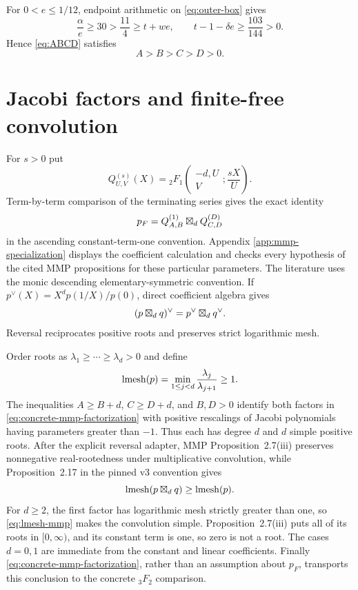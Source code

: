 \documentclass[12pt]{article}
\begin{document}
For $0<e\le1/12$, endpoint arithmetic on \eqref{eq:outer-box} gives
\begin{equation}\label{eq:ordering-margins}
 \frac\alpha e\ge30>\frac{11}{4}\ge t+we,\qquad
 t-1-\delta e\ge\frac{103}{144}>0.
\end{equation}
Hence \eqref{eq:ABCD} satisfies
\begin{equation}\label{eq:ABCD-order}
 A>B>C>D>0.
\end{equation}

\section{Jacobi factors and finite-free convolution}\label{sec:finitefree}

For $s>0$ put
\[
 Q_{U,V}^{(s)}(X)={}_2F_1\!\left(
 \begin{matrix}-d,U\\V\end{matrix};\frac{sX}{U}\right).
\]
Term-by-term comparison of the terminating series gives the exact identity
\begin{equation}\label{eq:concrete-mmp-factorization}
 p_F=Q_{A,B}^{(1)}\boxtimes_d Q_{C,D}^{(D)}
\end{equation}
in the ascending constant-term-one convention.  Appendix
\ref{app:mmp-specialization} displays the coefficient calculation and checks
every hypothesis of the cited MMP propositions for these particular
parameters.  The literature uses the monic descending elementary-symmetric
convention.  If
$p^\vee(X)=X^dp(1/X)/p(0)$, direct coefficient algebra gives
\begin{equation}\label{eq:reversal-convolution}
 (p\boxtimes_d q)^\vee=p^\vee\boxtimes_d q^\vee.
\end{equation}
Reversal reciprocates positive roots and preserves strict logarithmic mesh.

Order roots as $\lambda_1\ge\cdots\ge\lambda_d>0$ and define
\begin{equation}\label{eq:lmesh}
 \operatorname{lmesh}(p)=\min_{1\le j<d}\frac{\lambda_j}{\lambda_{j+1}}\ge1.
\end{equation}
The inequalities $A\ge B+d$, $C\ge D+d$, and $B,D>0$ identify both factors
in \eqref{eq:concrete-mmp-factorization} with positive rescalings of Jacobi
polynomials having parameters greater than $-1$.  Thus each has degree $d$
and $d$ simple positive roots.  After the explicit reversal adapter, MMP
Proposition~2.7(iii) preserves nonnegative real-rootedness under
multiplicative convolution, while Proposition~2.17 in the pinned v3
convention gives
\begin{equation}\label{eq:lmesh-mmp}
 \operatorname{lmesh}(p\boxtimes_d q)\ge\operatorname{lmesh}(p).
\end{equation}
For $d\ge2$, the first factor has logarithmic mesh strictly greater than one,
so \eqref{eq:lmesh-mmp} makes the convolution simple.  Proposition~2.7(iii)
puts all of its roots in $[0,\infty)$, and its constant term is one, so zero
is not a root.  The cases $d=0,1$ are immediate from the constant and linear
coefficients.  Finally \eqref{eq:concrete-mmp-factorization}, rather than an
assumption about $p_F$, transports this conclusion to the concrete
${}_3F_2$ comparison.
\end{document}
